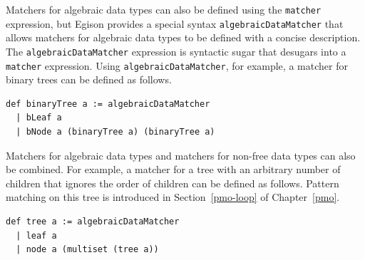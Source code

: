 Matchers for algebraic data types can also be defined using the \lstinline{matcher} expression, but Egison provides a special syntax \lstinline{algebraicDataMatcher} that allows matchers for algebraic data types to be defined with a concise description.
The \lstinline{algebraicDataMatcher} expression is syntactic sugar that desugars into a \lstinline{matcher} expression.
Using \lstinline{algebraicDataMatcher}, for example, a matcher for binary trees can be defined as follows.
\begin{lstlisting}[language=egison,numbers=none]
def binaryTree a := algebraicDataMatcher
  | bLeaf a
  | bNode a (binaryTree a) (binaryTree a)
\end{lstlisting}
Matchers for algebraic data types and matchers for non-free data types can also be combined.
For example, a matcher for a tree with an arbitrary number of children that ignores the order of children can be defined as follows.
Pattern matching on this tree is introduced in Section~\ref{pmo-loop} of Chapter~\ref{pmo}.
\begin{lstlisting}[language=egison,numbers=none]
def tree a := algebraicDataMatcher
  | leaf a
  | node a (multiset (tree a))
\end{lstlisting}
